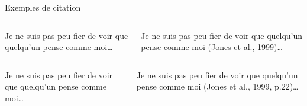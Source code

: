 \begin{frame}[fragile]{Exemples de citation}
		\pause
		
		\begin{columns}
			\vspace{-4.5mm}
\begin{codesource}
	Je ne suis pas peu fier de voir que quelqu'un
	pense comme moi\citep{jones99}\ldots
\end{codesource}
			Je ne suis pas peu fier de voir que quelqu'un pense comme moi (Jones et al., 1999)\ldots
		\end{columns}
	
		\begin{columns}
			\column{.49\textwidth}
			\vspace{-4.5mm}
\begin{codesource}
	Je ne suis pas peu fier de voir que quelqu'un
	pense comme moi\citep[p.22]{jones99}\ldots
\end{codesource}
			\column{.49\textwidth}
			Je ne suis pas peu fier de voir que quelqu'un pense comme moi (Jones et al., 1999, p.22)\ldots
		\end{columns}
\end{frame}